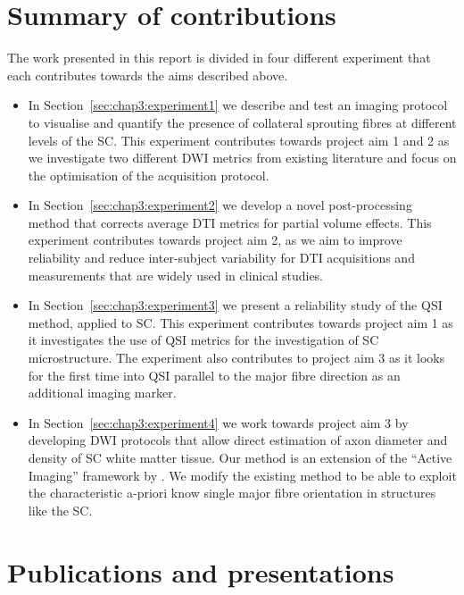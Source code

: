 \section{Summary of contributions}
The work presented in this report is divided in four different experiment that each contributes towards the aims described above.
\begin{itemize}
  \item In Section~\ref{sec:chap3:experiment1} we describe and test an imaging protocol to visualise and quantify the presence of collateral sprouting fibres at different levels of the \gls{SC}. This experiment contributes towards project aim 1 and 2 as we investigate two different \gls{DWI} metrics from existing literature and focus on the optimisation of the acquisition protocol.
  \item In Section~\ref{sec:chap3:experiment2} we develop a novel post-processing method that corrects average \gls{DTI} metrics for partial volume effects. This experiment contributes towards project aim 2, as we aim to improve reliability and reduce inter-subject variability for \gls{DTI} acquisitions and measurements that are widely used in clinical studies.
  \item In Section~\ref{sec:chap3:experiment3} we present a reliability study of the \gls{QSI} method, applied to \gls{SC}. This experiment contributes towards project aim 1  as it investigates the use of \gls{QSI} metrics for the investigation of \gls{SC} microstructure. The experiment also contributes to project aim 3 as it looks for the first time into \gls{QSI} parallel to the major fibre direction as an additional imaging marker.
  \item In Section~\ref{sec:chap3:experiment4} we work towards project aim 3 by developing \gls{DWI} protocols that allow direct estimation of axon diameter and density of SC white matter tissue. Our method is an extension of the ``Active Imaging'' framework by \citet{Alexander:2010}. We modify the existing method to be able to exploit the characteristic a-priori know single major fibre orientation in structures like the \gls{SC}. 
\end{itemize}
\section{Publications and presentations}
